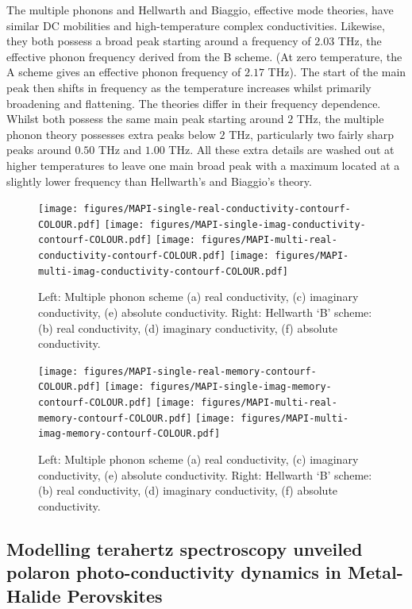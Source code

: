 The multiple phonons and Hellwarth and Biaggio, effective mode theories, have similar DC mobilities and high-temperature complex conductivities. Likewise, they both possess a broad peak starting around a frequency of $2.03$ THz, the effective phonon frequency derived from the B scheme. (At zero temperature, the A scheme gives an effective phonon frequency of $2.17$ THz). The start of the main peak then shifts in frequency as the temperature increases whilst primarily broadening and flattening. The theories differ in their frequency dependence. Whilst both possess the same main peak starting around $2$ THz, the multiple phonon theory possesses extra peaks below $2$ THz, particularly two fairly sharp peaks around $0.50$ THz and $1.00$ THz. All these extra details are washed out at higher temperatures to leave one main broad peak with a maximum located at a slightly lower frequency than Hellwarth's and Biaggio's theory.

\begin{figure}
    \centering
    \texttt{[image: figures/MAPI-single-real-conductivity-contourf-COLOUR.pdf]}
    \texttt{[image: figures/MAPI-single-imag-conductivity-contourf-COLOUR.pdf]}
    \texttt{[image: figures/MAPI-multi-real-conductivity-contourf-COLOUR.pdf]}
    \texttt{[image: figures/MAPI-multi-imag-conductivity-contourf-COLOUR.pdf]}
    \caption{Left: Multiple phonon scheme (a) real conductivity, (c) imaginary conductivity, (e) absolute conductivity. Right: Hellwarth `B' scheme: (b) real conductivity, (d) imaginary conductivity, (f) absolute conductivity.}
    \label{fig:multicontour}
\end{figure}

\begin{figure}
    \centering
    \texttt{[image: figures/MAPI-single-real-memory-contourf-COLOUR.pdf]}
    \texttt{[image: figures/MAPI-single-imag-memory-contourf-COLOUR.pdf]}
    \texttt{[image: figures/MAPI-multi-real-memory-contourf-COLOUR.pdf]}
    \texttt{[image: figures/MAPI-multi-imag-memory-contourf-COLOUR.pdf]}
    \caption{Left: Multiple phonon scheme (a) real conductivity, (c) imaginary conductivity, (e) absolute conductivity. Right: Hellwarth `B' scheme: (b) real conductivity, (d) imaginary conductivity, (f) absolute conductivity.}
    \label{fig:multicontour}
\end{figure}

\subsection{Modelling terahertz spectroscopy unveiled polaron photo-conductivity dynamics in Metal-Halide Perovskites}

